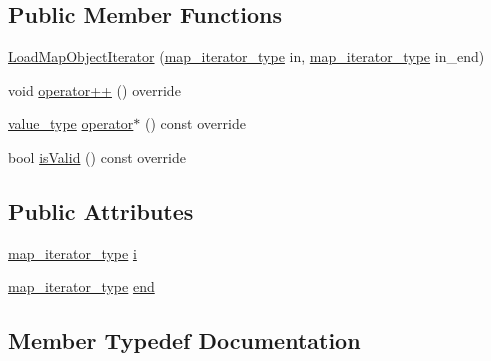 \subsection*{Public Member Functions}
\begin{DoxyCompactItemize}
\item 
\hyperlink{structvt_1_1vrt_1_1collection_1_1balance_1_1_load_map_object_iterator_a7f0af57c990883d3dbf1884665c36a85}{Load\+Map\+Object\+Iterator} (\hyperlink{structvt_1_1vrt_1_1collection_1_1balance_1_1_load_map_object_iterator_ae487f542c8875bc4cd60da54da5545ce}{map\+\_\+iterator\+\_\+type} in, \hyperlink{structvt_1_1vrt_1_1collection_1_1balance_1_1_load_map_object_iterator_ae487f542c8875bc4cd60da54da5545ce}{map\+\_\+iterator\+\_\+type} in\+\_\+end)
\item 
void \hyperlink{structvt_1_1vrt_1_1collection_1_1balance_1_1_load_map_object_iterator_ad475d61170e3aea498d4d2c403bcc0b1}{operator++} () override
\item 
\hyperlink{structvt_1_1vrt_1_1collection_1_1balance_1_1_object_iterator_impl_a8a38ab2c722e341d729f61cb59112376}{value\+\_\+type} \hyperlink{structvt_1_1vrt_1_1collection_1_1balance_1_1_load_map_object_iterator_a2f9011bf25bb74168d62db39b0f33d81}{operator$\ast$} () const override
\item 
bool \hyperlink{structvt_1_1vrt_1_1collection_1_1balance_1_1_load_map_object_iterator_a42b545ead5d94d4a07478977d70567da}{is\+Valid} () const override
\end{DoxyCompactItemize}
\subsection*{Public Attributes}
\begin{DoxyCompactItemize}
\item 
\hyperlink{structvt_1_1vrt_1_1collection_1_1balance_1_1_load_map_object_iterator_ae487f542c8875bc4cd60da54da5545ce}{map\+\_\+iterator\+\_\+type} \hyperlink{structvt_1_1vrt_1_1collection_1_1balance_1_1_load_map_object_iterator_a919c8b6baaa2d0de90ff61fb8e7adcd1}{i}
\item 
\hyperlink{structvt_1_1vrt_1_1collection_1_1balance_1_1_load_map_object_iterator_ae487f542c8875bc4cd60da54da5545ce}{map\+\_\+iterator\+\_\+type} \hyperlink{structvt_1_1vrt_1_1collection_1_1balance_1_1_load_map_object_iterator_a61889f49ea85bc3e6264e7ff78964311}{end}
\end{DoxyCompactItemize}


\subsection{Member Typedef Documentation}
\mbox{\label{structvt_1_1vrt_1_1collection_1_1balance_1_1_load_map_object_iterator_aa2d73306ea28e7f249a28d40dc963fdb}} 
